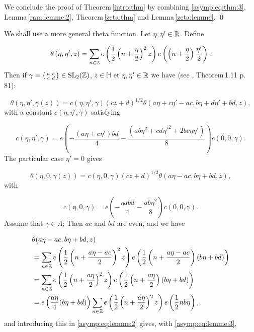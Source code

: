 \documentclass[leqno,10pt]{amsart}
\theoremstyle{plain}
\numberwithin{equation}{section}
\theoremstyle{definition}
\theoremstyle{remark}
\begin{document}
We conclude the proof of Theorem\,\ref{intro:thm} by combining \eqref{asymp:eq:thm:3}, Lemma\,\ref{ram:lemme:2}, Theorem\,\ref{zeta:thm} and Lemma\,\ref{zeta:lemme}. 
\qed

We shall use a more general theta function. Let $\eta, \eta' \in \mathbb{R}$. Define

\begin{equation}\label{asymp:eq:lemme:1}
\theta\left(\eta, \eta', z\right) = \sum_{n \in \mathbb{Z}}e\left(\frac{1}{2}\left(n+\frac{\eta}{2}\right)^2 z\right) e\left(\left(n+\frac{\eta}{2}\right)\frac{\eta'}{2}\right).
\end{equation}
Then if $\gamma = \left(\begin{smallmatrix}a&b \\ c&d \end{smallmatrix}\right) \in \rm{SL}_2(\mathbb{Z})$, $z \in \mathbb{H}$ et $\eta,\eta' \in \mathbb{R}$ we have (see \cite{far-kra:theta}, Theorem\,1.11 p. 81):

\begin{equation*}
\theta(\eta,\eta',\gamma(z)) = c(\eta,\eta',\gamma) (cz+d)^{1/2} \theta(a\eta+c\eta'-ac,b\eta+d\eta'+bd,z),
\end{equation*}
with a constant $c(\eta,\eta',\gamma)$ satisfying

\begin{equation*}
c(\eta,\eta',\gamma) = e\left(-\frac{(a\eta+c\eta')bd}{4}-\frac{(ab\eta^2+cd\eta'^2+2bc\eta\eta')}{8}\right) c(0,0,\gamma).
\end{equation*}
The particular case $\eta'=0$ gives

\begin{equation}\label{asymp:eq:lemme:2}
\theta(\eta,0,\gamma(z)) = c(\eta,0,\gamma) (cz+d)^{1/2} \theta(a\eta-ac,b\eta+bd,z),
\end{equation}
with 

\begin{equation}\label{asymp:eq:lemme:3}
c(\eta,0,\gamma) = e\left(-\frac{\eta abd}{4}-\frac{ab\eta^2}{8}\right) c(0,0,\gamma).
\end{equation}
Assume that $\gamma\in\Lambda$; Then $ac$ and $bd$ are even, and we have

\begin{align*}
&\theta(a\eta-ac,b\eta+bd,z)\\
&= \sum_{n \in \mathbb{Z}}e\left(\frac{1}{2}\left(n+\frac{a\eta-ac}{2}\right)^2 z\right) e\left(\frac{1}{2}\left(n+\frac{a\eta-ac}{2}\right)(b\eta+bd)\right)\\
&= \sum_{n \in \mathbb{Z}}e\left(\frac{1}{2}\left(n+\frac{a\eta}{2}\right)^2 z\right) e\left(\frac{1}{2}\left(n+\frac{a\eta}{2}\right)(b\eta+bd)\right)\\
&= e\left(\frac{a\eta}{4}(b\eta+bd)\right) \sum_{n \in \mathbb{Z}}e\left(\frac{1}{2}\left(n+\frac{a\eta}{2}\right)^2 z\right) e\left(\frac{1}{2}nb\eta\right),
\end{align*}
and introducing this in \eqref{asymp:eq:lemme:2} gives, with \eqref{asymp:eq:lemme:3},
\end{document}
